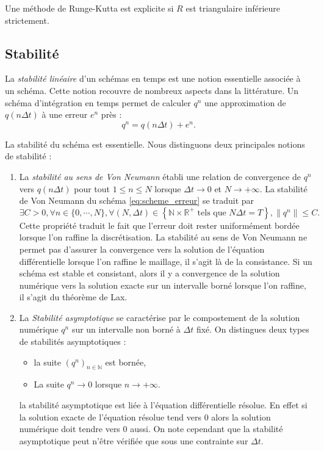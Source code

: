 \begin{proposition}
Une méthode de Runge-Kutta est explicite si $R$ est triangulaire inférieure strictement.
\end{proposition}




\subsection{Stabilité}

La \textit{stabilité linéaire} d'un schémas en temps est une notion essentielle associée à un schéma. Cette notion recouvre de nombreux aspects dans la littérature.
Un schéma d'intégration en temps permet de calculer $q^n$ une approximation de $q(n \Delta t)$ à une erreur $e^n$ près :
\begin{equation}
q^n = q(n \Delta t) + e^n.
\label{eq:scheme_erreur}
\end{equation}

La stabilité du schéma est essentielle. Nous distinguons deux principales notions de stabilité :
\begin{enumerate}
\item La \textit{stabilité au sens de Von Neumann} établi une relation de convergence de $q^n$ vers $q(n \Delta t)$ pour tout $1 \leq n \leq N$ lorsque $\Delta t \rightarrow 0$ et $N \rightarrow + \infty$. 
La stabilité de Von Neumann du schéma \eqref{eq:scheme_erreur} se traduit par
\begin{equation}
\exists C >0, \forall n \in \{ 0 , \cdots , N \}, \forall (N, \Delta t) \in \left\lbrace \mathbb{N} \times \mathbb{R}^+ \text{ tels que } N \Delta t = T \right\rbrace, \| q^n \| \leq C.
\end{equation}
Cette propriété traduit le fait que l'erreur doit rester uniformément bordée lorsque l'on raffine la discrétisation. La stabilité au sens de Von Neumann ne permet pas d'assurer la convergence vers la solution de l'équation différentielle lorsque l'on raffine le maillage, il s'agit là de la consistance. Si un schéma est stable et consistant, alors il y a convergence de la solution numérique vers la solution exacte sur un intervalle borné lorsque l'on raffine, il s'agit du théorème de Lax.

\item La \textit{Stabilité asymptotique} se caractérise par le compostement de la solution numérique $q^n$ sur un intervalle non borné à $\Delta t$ fixé. On distingues deux types de stabilités asymptotiques :
\begin{itemize}
\item la suite $(q^n)_{n \in \mathbb{N}}$ est bornée,
\item La suite $q^n \rightarrow 0$ lorsque $n \rightarrow + \infty$.
\end{itemize}
la stabilité asymptotique est liée à l'équation différentielle résolue. En effet si la solution exacte de l'équation résolue tend vers $0$ alors la solution numérique doit tendre vers $0$ aussi. On note cependant que la stabilité asymptotique peut n'être vérifiée que sous une contrainte sur $\Delta t$.
\end{enumerate} 

